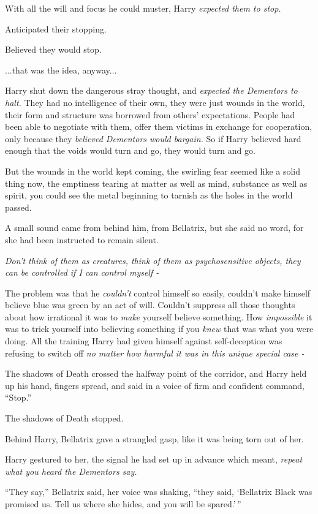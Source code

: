 With all the will and focus he could muster, Harry \emph{expected them
to stop.}

Anticipated their stopping.

Believed they would stop.

...that was the idea, anyway...

Harry shut down the dangerous stray thought, and \emph{expected the
Dementors to halt.} They had no intelligence of their own, they were
just wounds in the world, their form and structure was borrowed from
others' expectations. People had been able to negotiate with them, offer
them victims in exchange for cooperation, only because they
\emph{believed Dementors would bargain.} So if Harry believed hard
enough that the voids would turn and go, they would turn and go.

But the wounds in the world kept coming, the swirling fear seemed like a
solid thing now, the emptiness tearing at matter as well as mind,
substance as well as spirit, you could see the metal beginning to
tarnish as the holes in the world passed.

A small sound came from behind him, from Bellatrix, but she said no
word, for she had been instructed to remain silent.

\emph{Don't think of them as creatures, think of them as psychosensitive
objects, they can be controlled if I can control myself -}

The problem was that he \emph{couldn't} control himself so easily,
couldn't make himself believe blue was green by an act of will. Couldn't
suppress all those thoughts about how irrational it was to \emph{make}
yourself believe something. How \emph{impossible} it was to trick
yourself into believing something if you \emph{knew} that was what you
were doing. All the training Harry had given himself against
self-deception was refusing to switch off \emph{no matter how harmful it
was in this unique special case -}

The shadows of Death crossed the halfway point of the corridor, and
Harry held up his hand, fingers spread, and said in a voice of firm and
confident command, ``Stop.''

The shadows of Death stopped.

Behind Harry, Bellatrix gave a strangled gasp, like it was being torn
out of her.

Harry gestured to her, the signal he had set up in advance which meant,
\emph{repeat what you heard the Dementors say.}

``They say,'' Bellatrix said, her voice was shaking, ``they said,
`Bellatrix Black was promised us. Tell us where she hides, and you will
be spared.'\,''

